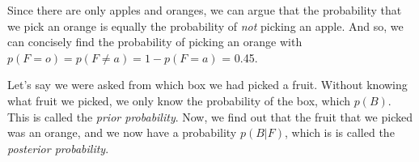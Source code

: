 \documentclass{tufte-handout}
\begin{document}
Since there are only apples and oranges, we can argue that the probability that
we pick an orange is equally the probability of \emph{not} picking an apple. And
so, we can concisely find the probability of picking an orange with
$p(F = o) = p(F \neq a) = 1 - p(F = a)$ = 0.45.

Let's say we were asked from which box we had picked a fruit. Without knowing
what fruit we picked, we only know the probability of the box, which $p(B)$.
This is called the \emph{prior probability}. Now, we find out that the fruit
that we picked was an orange, and we now have a probability $p(B|F)$, which is
is called the \emph{posterior probability}.

% 
% 
\end{document}

